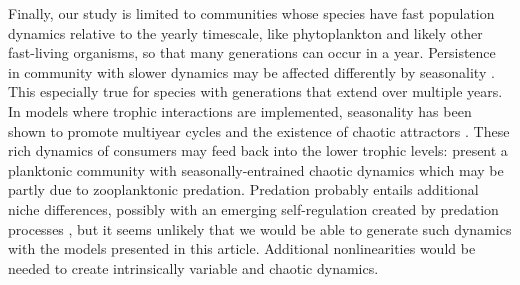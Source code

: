 \documentclass[a4paper,12pt]{article}
\begin{document}
Finally, our study is limited to communities whose species have fast
population dynamics relative to the yearly timescale, like phytoplankton
and likely other fast-living organisms, so that many generations can
occur in a year. Persistence in community with slower dynamics may
be affected differently by seasonality \citep{miller_evolutionary_2017}.
This especially true for species with generations that extend over
multiple years. In models where trophic interactions are implemented,
seasonality has been shown to promote multiyear cycles and the existence
of chaotic attractors \citep{rinaldi_multiple_1993,taylor_how_2013,tyson_seasonally_2016}.
These rich dynamics of consumers may feed back into the lower trophic
levels: \citet{dakos_interannual_2009} present a planktonic community
with seasonally-entrained chaotic dynamics which may be partly due
to zooplanktonic predation. Predation probably entails additional
niche differences, possibly with an emerging self-regulation created
by predation processes \citep{chesson_updates_2018}, but it seems
unlikely that we would be able to generate such dynamics with the
models presented in this article. Additional nonlinearities would
be needed to create intrinsically variable and chaotic dynamics.
\end{document}
